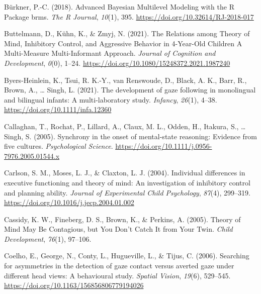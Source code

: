 \documentclass[
  man,floatsintext]{apa6}
\newlength{\cslhangindent}
\newlength{\cslentryspacingunit} %
\newenvironment{CSLReferences}[2] %
 {%
  \setlength{\parindent}{0pt}
  \ifodd #1
  \let\oldpar\par
  \def\par{\hangindent=\cslhangindent\oldpar}
  \fi
  \setlength{\parskip}{#2\cslentryspacingunit}
 }%
 {}
\begin{document}
\begin{CSLReferences}{1}{0}
\leavevmode{}%
Bürkner, P.-C. (2018). Advanced {Bayesian Multilevel Modeling} with the {R Package} brms. \emph{The R Journal}, \emph{10}(1), 395. \url{https://doi.org/10.32614/RJ-2018-017}

\leavevmode{}%
Buttelmann, D., Kühn, K., \& Zmyj, N. (2021). The {Relations} among {Theory} of {Mind}, {Inhibitory Control}, and {Aggressive Behavior} in 4-{Year-Old Children} \textendash{} {A Multi-Measure Multi-Informant Approach}. \emph{Journal of Cognition and Development}, \emph{0}(0), 1--24. \url{https://doi.org/10.1080/15248372.2021.1987240}

\leavevmode{}%
Byers-Heinlein, K., Tsui, R. K.-Y., van Renswoude, D., Black, A. K., Barr, R., Brown, A., \ldots{} Singh, L. (2021). The development of gaze following in monolingual and bilingual infants: {A} multi-laboratory study. \emph{Infancy}, \emph{26}(1), 4--38. \url{https://doi.org/10.1111/infa.12360}

\leavevmode{}%
Callaghan, T., Rochat, P., Lillard, A., Claux, M. L., Odden, H., Itakura, S., \ldots{} Singh, S. (2005). Synchrony in the onset of mental-state reasoning: {Evidence} from five cultures. \emph{Psychological Science}. \url{https://doi.org/10.1111/j.0956-7976.2005.01544.x}

\leavevmode{}%
Carlson, S. M., Moses, L. J., \& Claxton, L. J. (2004). Individual differences in executive functioning and theory of mind: {An} investigation of inhibitory control and planning ability. \emph{Journal of Experimental Child Psychology}, \emph{87}(4), 299--319. \url{https://doi.org/10.1016/j.jecp.2004.01.002}

\leavevmode{}%
Cassidy, K. W., Fineberg, D. S., Brown, K., \& Perkins, A. (2005). Theory of {Mind May Be Contagious}, but {You Don}'t {Catch It} from {Your Twin}. \emph{Child Development}, \emph{76}(1), 97--106.

\leavevmode{}%
Coelho, E., George, N., Conty, L., Hugueville, L., \& Tijus, C. (2006). Searching for asymmetries in the detection of gaze contact versus averted gaze under different head views: A behavioural study. \emph{Spatial Vision}, \emph{19}(6), 529--545. \url{https://doi.org/10.1163/156856806779194026}


\end{CSLReferences}
\end{document}
